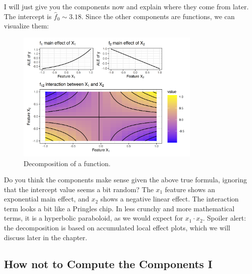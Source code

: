 \documentclass[
  11pt,
]{scrbook}
\begin{document}
I will just give you the components now and explain where they come from later.
The intercept is \(\hat{f}_0\sim3.18\).
Since the other components are functions, we can visualize them:

\begin{figure}

{\centering \includegraphics[width=0.8\textwidth]{images/unnamed-chunk-17-1} 

}

\caption{Decomposition of a function.}\label{fig:unnamed-chunk-17}
\end{figure}

Do you think the components make sense given the above true formula, ignoring that the intercept value seems a bit random?
The \(x_1\) feature shows an exponential main effect, and \(x_2\) shows a negative linear effect.
The interaction term looks a bit like a Pringles chip.
In less crunchy and more mathematical terms, it is a hyperbolic paraboloid, as we would expect for \(x_1 \cdot x_2\).
Spoiler alert: the decomposition is based on accumulated local effect plots, which we will discuss later in the chapter.

\hypertarget{how-not-to-compute-the-components-i}{%
\subsection{How not to Compute the Components I}\label{how-not-to-compute-the-components-i}}
\end{document}
